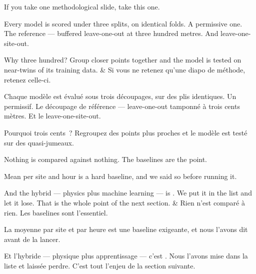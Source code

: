 \documentclass[10pt,a4paper]{article}
\begin{document}
\begin{say}
If you take one methodological slide, take this one.

Every model is scored under three splits, on identical folds. A permissive one.
The reference --- buffered leave-one-out at three hundred metres. And
leave-one-site-out.

Why three hundred?  Group closer points together and the model is tested on
near-twins of its training data. 
&
Si vous ne retenez qu'une diapo de méthode, retenez celle-ci.

Chaque modèle est évalué sous trois découpages, sur des plis identiques. Un
permissif. Le découpage de référence --- leave-one-out tamponné à trois cents
mètres. Et le leave-one-site-out.

Pourquoi trois cents~?  Regroupez des points plus proches et le modèle est
testé sur des quasi-jumeaux. 
\end{say}

\begin{say}
Nothing is compared against nothing. The baselines are the point.

Mean per site and hour is a hard baseline, and we said so before running it.

And the hybrid --- physics plus machine learning --- is . We put it in the list and let it lose. That is the
whole point of the next section.
&
Rien n'est comparé à rien. Les baselines sont l'essentiel.

La moyenne par site et par heure est une baseline exigeante, et nous l'avons dit
avant de la lancer.

Et l'hybride --- physique plus apprentissage --- c'est . Nous l'avons mise dans la liste et laissée perdre.
C'est tout l'enjeu de la section suivante.
\end{say}

\clearpage
\end{document}
